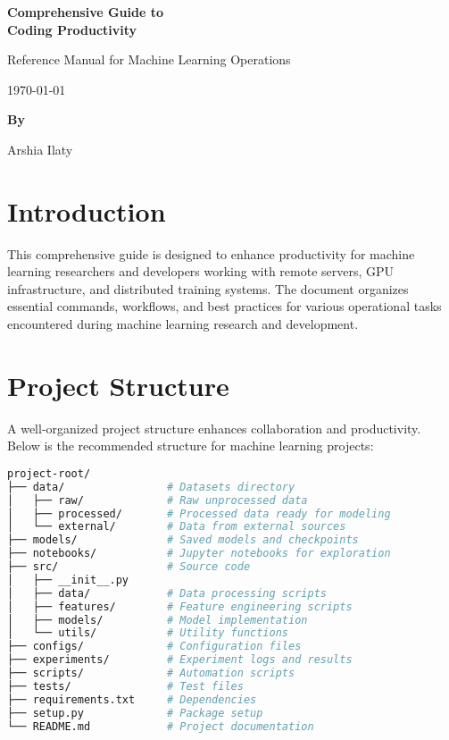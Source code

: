 \documentclass{article}
\begin{document}
\begin{titlepage}
  \centering
  \vspace*{2cm}
  {\Huge\bfseries Comprehensive Guide to\\Coding Productivity\par}
  \vspace{1cm}
  {\Large Reference Manual for Machine Learning Operations\par}
  \vspace{3cm}
  {\large \today\par}
  \vspace{2cm}
  {\large\bfseries By\par}
  {\Huge Arshia Ilaty\par}
\end{titlepage}

\tableofcontents
\newpage

\section{Introduction}
This comprehensive guide is designed to enhance productivity for machine learning researchers and developers working with remote servers, GPU infrastructure, and distributed training systems. The document organizes essential commands, workflows, and best practices for various operational tasks encountered during machine learning research and development.

\section{Project Structure}
A well-organized project structure enhances collaboration and productivity. Below is the recommended structure for machine learning projects:

\begin{lstlisting}[language=bash, caption=Basic Project Structure]
project-root/
├── data/                # Datasets directory
│   ├── raw/             # Raw unprocessed data
│   ├── processed/       # Processed data ready for modeling
│   └── external/        # Data from external sources
├── models/              # Saved models and checkpoints
├── notebooks/           # Jupyter notebooks for exploration
├── src/                 # Source code
│   ├── __init__.py
│   ├── data/            # Data processing scripts
│   ├── features/        # Feature engineering scripts
│   ├── models/          # Model implementation
│   └── utils/           # Utility functions
├── configs/             # Configuration files
├── experiments/         # Experiment logs and results
├── scripts/             # Automation scripts
├── tests/               # Test files
├── requirements.txt     # Dependencies
├── setup.py             # Package setup
└── README.md            # Project documentation
\end{lstlisting}
\end{document}

